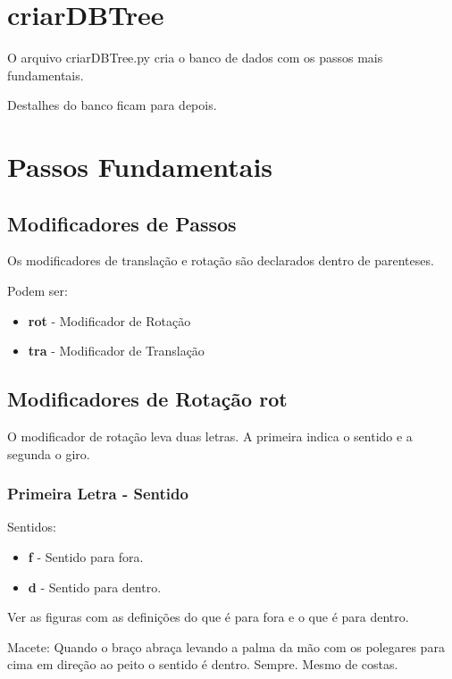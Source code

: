 
\section{criarDBTree}

O arquivo criarDBTree.py cria o banco de dados com os passos mais fundamentais.

Destalhes do banco ficam para depois.


\section{Passos Fundamentais}

\subsection{Modificadores de Passos}


Os modificadores de translação e rotação são declarados dentro de parenteses.

Podem ser:

\begin{itemize}
	\item \textbf{rot} - Modificador de Rotação
	\item \textbf{tra} - Modificador de Translação
\end{itemize}

\subsection{Modificadores de Rotação rot}


O modificador de rotação leva duas letras. A primeira indica o sentido e a segunda o giro.

\subsubsection{Primeira Letra - Sentido}

Sentidos:

\begin{itemize}
	\item \textbf{f} - Sentido para fora.
	\item \textbf{d} - Sentido para dentro.
\end{itemize}


Ver as figuras com as definições do que é para fora e o que é para dentro. 

Macete: Quando o braço abraça levando a palma da mão com os polegares para cima em direção ao peito o sentido é dentro. Sempre. Mesmo de costas.

